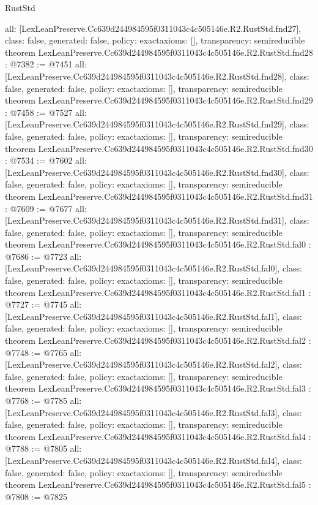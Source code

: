 \begin{lexlean}{RustStd}
\begin{coremodule}
{  all: [LexLeanPreserve.Cc639d244984595f0311043c4c505146e.R2.RustStd.fnd27],
  class: false,
  generated: false,
  policy: exact{axioms: []},
  transparency: semireducible
}
theorem LexLeanPreserve.Cc639d244984595f0311043c4c505146e.R2.RustStd.fnd28 : @7382 := @7451 {
  all: [LexLeanPreserve.Cc639d244984595f0311043c4c505146e.R2.RustStd.fnd28],
  class: false,
  generated: false,
  policy: exact{axioms: []},
  transparency: semireducible
}
theorem LexLeanPreserve.Cc639d244984595f0311043c4c505146e.R2.RustStd.fnd29 : @7458 := @7527 {
  all: [LexLeanPreserve.Cc639d244984595f0311043c4c505146e.R2.RustStd.fnd29],
  class: false,
  generated: false,
  policy: exact{axioms: []},
  transparency: semireducible
}
theorem LexLeanPreserve.Cc639d244984595f0311043c4c505146e.R2.RustStd.fnd30 : @7534 := @7602 {
  all: [LexLeanPreserve.Cc639d244984595f0311043c4c505146e.R2.RustStd.fnd30],
  class: false,
  generated: false,
  policy: exact{axioms: []},
  transparency: semireducible
}
theorem LexLeanPreserve.Cc639d244984595f0311043c4c505146e.R2.RustStd.fnd31 : @7609 := @7677 {
  all: [LexLeanPreserve.Cc639d244984595f0311043c4c505146e.R2.RustStd.fnd31],
  class: false,
  generated: false,
  policy: exact{axioms: []},
  transparency: semireducible
}
theorem LexLeanPreserve.Cc639d244984595f0311043c4c505146e.R2.RustStd.fal0 : @7686 := @7723 {
  all: [LexLeanPreserve.Cc639d244984595f0311043c4c505146e.R2.RustStd.fal0],
  class: false,
  generated: false,
  policy: exact{axioms: []},
  transparency: semireducible
}
theorem LexLeanPreserve.Cc639d244984595f0311043c4c505146e.R2.RustStd.fal1 : @7727 := @7745 {
  all: [LexLeanPreserve.Cc639d244984595f0311043c4c505146e.R2.RustStd.fal1],
  class: false,
  generated: false,
  policy: exact{axioms: []},
  transparency: semireducible
}
theorem LexLeanPreserve.Cc639d244984595f0311043c4c505146e.R2.RustStd.fal2 : @7748 := @7765 {
  all: [LexLeanPreserve.Cc639d244984595f0311043c4c505146e.R2.RustStd.fal2],
  class: false,
  generated: false,
  policy: exact{axioms: []},
  transparency: semireducible
}
theorem LexLeanPreserve.Cc639d244984595f0311043c4c505146e.R2.RustStd.fal3 : @7768 := @7785 {
  all: [LexLeanPreserve.Cc639d244984595f0311043c4c505146e.R2.RustStd.fal3],
  class: false,
  generated: false,
  policy: exact{axioms: []},
  transparency: semireducible
}
theorem LexLeanPreserve.Cc639d244984595f0311043c4c505146e.R2.RustStd.fal4 : @7788 := @7805 {
  all: [LexLeanPreserve.Cc639d244984595f0311043c4c505146e.R2.RustStd.fal4],
  class: false,
  generated: false,
  policy: exact{axioms: []},
  transparency: semireducible
}
theorem LexLeanPreserve.Cc639d244984595f0311043c4c505146e.R2.RustStd.fal5 : @7808 := @7825 {
}
\end{coremodule}
\end{lexlean}
